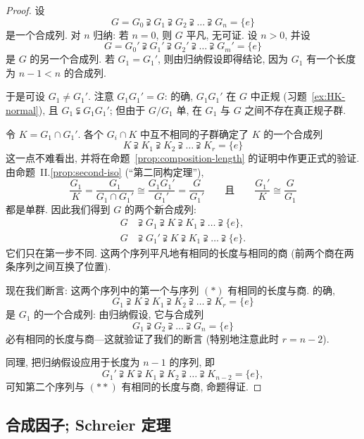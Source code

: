 \begin{proof}
设
\begin{equation*}
G = G_0 \supsetneqq G_1 \supsetneqq G_2 \supsetneqq \dots \supsetneqq G_n = \{e\}\tag{*}
\end{equation*}
是一个合成列. 对 $n$ 归纳: 若 $n = 0$, 则 $G$ 平凡, 无可证. 设 $n > 0$, 并设
\begin{equation*}
G = G_0' \supsetneqq G_1' \supsetneqq G_2' \supsetneqq \dots \supsetneqq G_m' = \{e\}\tag{**}
\end{equation*}
是 $G$ 的另一个合成列. 若 $G_1 = G_1'$, 则由归纳假设即得结论, 因为 $G_1$ 有一个长度为 $n - 1 < n$ 的合成列.

于是可设 $G_1 \neq G_1'$. 注意 $G_1G_1' = G$: 的确, $G_1G_1'$ 在 $G$ 中正规 (习题~\ref{ex:HK-normal}), 且 $G_1 \subsetneqq G_1G_1'$; 但由于 $G/G_1$ 单, 在 $G_1$ 与 $G$ 之间不存在真正规子群.

令 $K = G_1 \cap G_1'$. 各个 $G_i\cap K$ 中互不相同的子群确定了 $K$ 的一个合成列
\[
K \supsetneqq K_1 \supsetneqq K_2 \supsetneqq \dots \supsetneqq K_r = \{e\}
\]
这一点不难看出, 并将在命题~\ref{prop:composition-length} 的证明中作更正式的验证. 由命题~II.\ref{prop:second-iso} (``第二同构定理''),
\[
\frac{G_1}{K} = \frac{G_1}{G_1 \cap G_1'} \cong \frac{G_1G_1'}{G_1'} = \frac{G}{G_1'}\qquad\text{且}\qquad \frac{G_1'}{K} \cong \frac{G}{G_1}
\]
都是单群. 因此我们得到 $G$ 的两个新合成列:
\[
\begin{aligned}
G &\supsetneqq G_1 \supsetneqq K \supsetneqq K_1 \supsetneqq\dots\supsetneqq\{e\},\\
G &\supsetneqq G_1' \supsetneqq K \supsetneqq K_1 \supsetneqq\dots\supsetneqq\{e\}.
\end{aligned}
\]
它们只在第一步不同. 这两个序列平凡地有相同的长度与相同的商 (前两个商在两条序列之间互换了位置).

现在我们断言: 这两个序列中的第一个与序列 $(*)$ 有相同的长度与商. 的确,
\[
G_1 \supsetneqq K \supsetneqq K_1 \supsetneqq K_2 \supsetneqq \dots \supsetneqq K_r = \{e\}
\]
是 $G_1$ 的一个合成列: 由归纳假设, 它与合成列
\[
G_1 \supsetneqq G_2 \supsetneqq \dots \supsetneqq G_n = \{e\}
\]
必有相同的长度与商---这就验证了我们的断言 (特别地注意此时 $r = n - 2$).

同理, 把归纳假设应用于长度为 $n - 1$ 的序列, 即
\[
G_1' \supsetneqq K \supsetneqq K_1 \supsetneqq K_2 \supsetneqq \dots \supsetneqq K_{n-2} = \{e\},
\]
可知第二个序列与 $(**)$ 有相同的长度与商, 命题得证.
\end{proof}

\subsection{合成因子; Schreier 定理}
\label{subsec:composition-factors}

